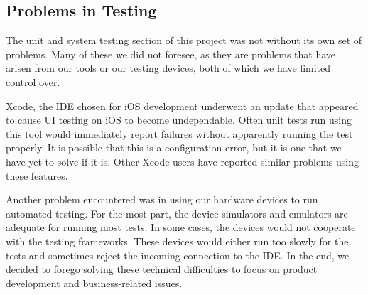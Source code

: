\subsection{Problems in Testing}

The unit and system testing section of this project was not without its own set
of problems. Many of these we did not foresee, as they are problems that have
arisen from our tools or our testing devices, both of which we have limited
control over.

Xcode, the IDE chosen for iOS development underwent an update that appeared to
cause UI testing on iOS to become undependable. Often unit tests run using this
tool would immediately report failures without apparently running the test
properly. It is possible that this is a configuration error, but it is one that
we have yet to solve if it is. Other Xcode users have reported similar problems
using these features.

Another problem encountered was in using our hardware devices to run automated
testing. For the most part, the device simulators and emulators are adequate for
running most tests. In some cases, the devices would not cooperate with the
testing frameworks. These devices would either run too slowly for the tests and
sometimes reject the incoming connection to the IDE. In the end, we decided to
forego solving these technical difficulties to focus on product development and
business-related issues.
